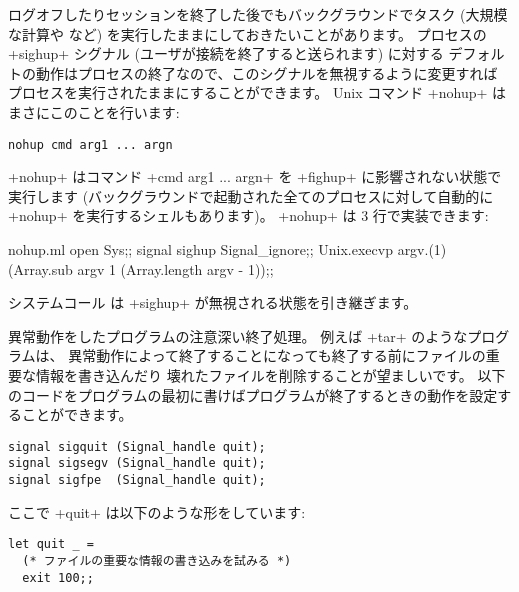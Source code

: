 \begin{example}
ログオフしたりセッションを終了した後でもバックグラウンドでタスク (大規模な計算や  など)
を実行したままにしておきたいことがあります。
プロセスの \ml+sighup+ シグナル (ユーザが接続を終了すると送られます) に対する
デフォルトの動作はプロセスの終了なので、このシグナルを無視するように変更すれば
プロセスを実行されたままにすることができます。
Unix コマンド \ml+nohup+ はまさにこのことを行います:
\begin{lstlisting}
nohup cmd arg1 ... argn
\end{lstlisting}
\ml+nohup+ はコマンド \ml+cmd arg1 ... argn+ を \ml+fighup+ に影響されない状態で実行します
(バックグラウンドで起動された全てのプロセスに対して自動的に \ml+nohup+ を実行するシェルもあります)。
\ml+nohup+ は 3 行で実装できます:
%
\begin{listingcodefile}{nohup.ml}
open Sys;;
signal sighup Signal_ignore;;
Unix.execvp argv.(1) (Array.sub argv 1 (Array.length argv - 1));;
\end{listingcodefile}
%
システムコール  は \ml+sighup+ が無視される状態を引き継ぎます。
\end{example}

\begin{example}
異常動作をしたプログラムの注意深い終了処理。
例えば \ml+tar+ のようなプログラムは、
異常動作によって終了することになっても終了する前にファイルの重要な情報を書き込んだり
壊れたファイルを削除することが望ましいです。
以下のコードをプログラムの最初に書けばプログラムが終了するときの動作を設定することができます。
%
\begin{lstlisting}
signal sigquit (Signal_handle quit);
signal sigsegv (Signal_handle quit);
signal sigfpe  (Signal_handle quit);
\end{lstlisting}
%
ここで \ml+quit+ は以下のような形をしています:
%
\begin{lstlisting}
let quit _ =
  (* ファイルの重要な情報の書き込みを試みる *)
  exit 100;;
\end{lstlisting}
\end{example}

